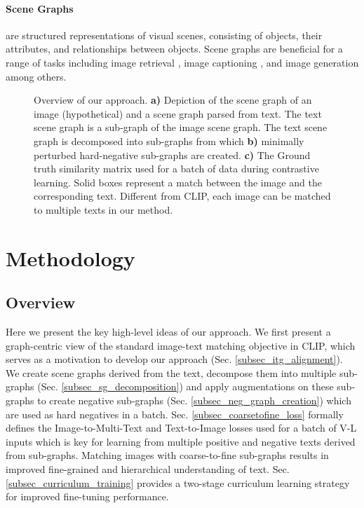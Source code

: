 \documentclass[11pt]{article}
\begin{document}
\paragraph{Scene Graphs} are structured representations of visual scenes, consisting of objects, their attributes, and relationships between objects. Scene graphs are beneficial for a range of tasks including image retrieval \citep{wu2019unified, johnson2015image}, image captioning \citep{yang2019auto}, and image generation \citep{johnson2018image} among others. \begin{figure*}[h]
    \centering
{}
    \hfill
    \caption{Overview of our approach. \textbf{a)} Depiction of the scene graph of an image (hypothetical) and a scene graph parsed from text. The text scene graph is a sub-graph of the image scene graph. The text scene graph is decomposed into sub-graphs from which \textbf{b)} minimally perturbed hard-negative sub-graphs are created. \textbf{c)} The Ground truth similarity matrix used for a batch of data during contrastive learning. Solid boxes represent a match between the image and the corresponding text. Different from CLIP, each image can be matched to multiple texts in our method.}
    
    \label{fig:method_overview}
    \vspace{-0.3cm}
\end{figure*}
\section{Methodology}
\label{sec_method}
\subsection{Overview}
\label{subsec_method_overview}
Here we present the key high-level ideas of our approach. We first present a graph-centric view of the standard image-text matching objective in CLIP, which serves as a motivation to develop our approach (Sec. \ref{subsec_itg_alignment}). We create scene graphs derived from the text, decompose them into multiple sub-graphs (Sec. \ref{subsec_sg_decomposition}) and apply augmentations on these sub-graphs to create negative sub-graphs (Sec. \ref{subsec_neg_graph_creation}) which are used as hard negatives in a batch. Sec. \ref{subsec_coarsetofine_loss} formally defines the Image-to-Multi-Text and Text-to-Image losses used for a batch of V-L inputs which is key for learning from multiple positive and negative texts derived from sub-graphs. Matching images with coarse-to-fine sub-graphs results in improved fine-grained and hierarchical understanding of text. Sec. \ref{subsec_curriculum_training} provides a two-stage curriculum learning strategy for improved fine-tuning performance.
\end{document}
